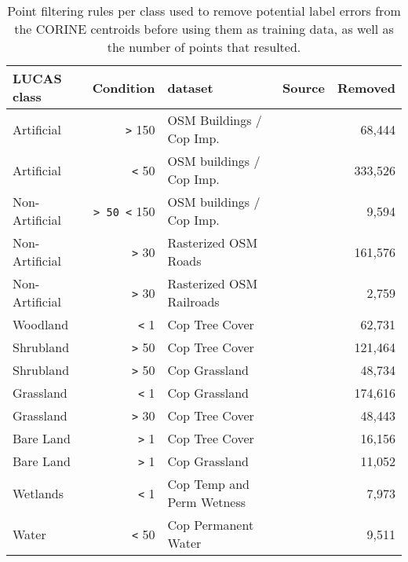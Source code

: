 \begin{table}[H]
    \caption{Point filtering rules per class used to remove potential label errors from the CORINE centroids before using them as training data, as well as the number of points that resulted.}
    
    \begin{tabular}{lrlrr}
    \hline
    LUCAS class    & Condition  & dataset                                      & Source & Removed \\
    \hline
    Artificial     & \verb|>| 150    & OSM Buildings / Cop Imp.  & \citep{witjes2022spatiotemporal}       & 68,444  \\
    Artificial     & \verb|<| 50     & OSM buildings / Cop Imp.  & \citep{witjes2022spatiotemporal}       & 333,526 \\
    Non-Artificial & \verb|> 50 <| 150 & OSM buildings / Cop Imp.  & \citep{witjes2022spatiotemporal}       & 9,594   \\
    Non-Artificial & \verb|>| 30     & Rasterized OSM Roads                       & \citep{witjes2022spatiotemporal}       & 161,576 \\
    Non-Artificial & \verb|>| 30     & Rasterized OSM Railroads                   & \citep{witjes2022spatiotemporal}       & 2,759   \\
    Woodland       & \verb|<| 1      & Cop Tree Cover                      &   \citep{copernicus2023hrl}      & 62,731  \\
    Shrubland      & \verb|>| 50     & Cop Tree Cover                      &  \citep{copernicus2023hrl}       & 121,464 \\
    Shrubland      & \verb|>| 50     & Cop Grassland                       &  \citep{copernicus2023hrl}       & 48,734  \\
    Grassland      & \verb|<| 1      & Cop Grassland                       &  \citep{copernicus2023hrl}       & 174,616 \\
    Grassland      & \verb|>| 30     & Cop Tree Cover                      &  \citep{copernicus2023hrl}       & 48,443  \\
    Bare Land      & \verb|>| 1      & Cop Tree Cover                      &  \citep{copernicus2023hrl}       & 16,156  \\
    Bare Land      & \verb|>| 1      & Cop Grassland                       &  \citep{copernicus2023hrl}       & 11,052  \\
    Wetlands       & \verb|<| 1      & Cop Temp and Perm Wetness &  \citep{copernicus2023hrl}       & 7,973   \\
    Water          & \verb|<| 50     & Cop Permanent Water                 &  \citep{copernicus2023hrl}       & 9,511 \\
    \hline
    \end{tabular}
    \end{table}

